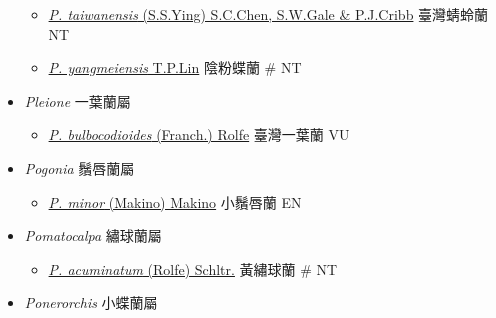 \begin{itemize}
\begin{itemize}
        \item[] \href{http://www.theplantlist.org/tpl1.1/search?q=Platanthera+taiwanensis}{\textit{P. taiwanensis} (S.S.Ying) S.C.Chen, S.W.Gale \& P.J.Cribb}   臺灣蜻蛉蘭   NT
        \item[] \href{http://www.theplantlist.org/tpl1.1/search?q=Platanthera+yangmeiensis}{\textit{P. yangmeiensis} T.P.Lin}   陰粉蝶蘭  \# NT
  \end{itemize}
 \item[] \textit{Pleione} 一葉蘭屬
                                
  \begin{itemize}
        \item[] \href{http://www.theplantlist.org/tpl1.1/search?q=Pleione+bulbocodioides}{\textit{P. bulbocodioides} (Franch.) Rolfe}   臺灣一葉蘭   VU
  \end{itemize}
 \item[] \textit{Pogonia} 鬚唇蘭屬
                                
  \begin{itemize}
        \item[] \href{http://www.theplantlist.org/tpl1.1/search?q=Pogonia+minor}{\textit{P. minor} (Makino) Makino}   小鬚唇蘭   EN
  \end{itemize}
 \item[] \textit{Pomatocalpa} 繡球蘭屬
                                
  \begin{itemize}
        \item[] \href{http://www.theplantlist.org/tpl1.1/search?q=Pomatocalpa+acuminatum}{\textit{P. acuminatum} (Rolfe) Schltr.}   黃繡球蘭  \# NT
  \end{itemize}
 \item[] \textit{Ponerorchis} 小蝶蘭屬
                                

\end{itemize}
